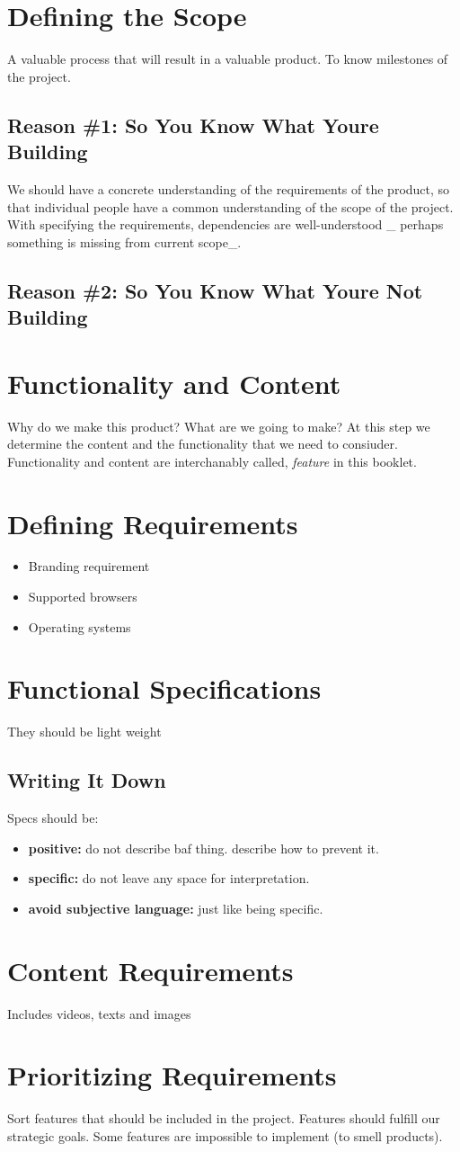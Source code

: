 \section{Defining the Scope}
A valuable process that will result in a valuable product. To know milestones of the project.
\subsection{Reason \#1: So You Know What Youre Building}
We should have a concrete understanding of the requirements of the product, so that individual people have a common understanding of the scope of the project. With specifying the 
requirements, dependencies are well-understood \_ perhaps something is missing from current scope\_.
\subsection{Reason \#2: So You Know What Youre Not Building}
\section{Functionality and Content}
Why do we make this product? What are we going to make? At this step we determine the content and the functionality that we need
 to consiuder. Functionality and content are interchanably called, \textit{feature} in this booklet.
\section{Defining Requirements}
\begin{itemize}
    \item Branding requirement
    \item Supported browsers
    \item Operating systems
\end{itemize}
\section{Functional Specifications}
They should be light weight
\subsection{Writing It Down}
Specs should be:
\begin{itemize}
    \item \textbf{positive: } do not describe baf thing. describe how to prevent it.
    \item \textbf{specific: } do not leave any space for interpretation.
    \item \textbf{avoid subjective language: } just like being specific. 
\end{itemize}
\section{Content Requirements}
Includes videos, texts and images
\section{Prioritizing Requirements}
Sort features that should be included in the project. Features should fulfill our strategic goals. 
Some features are impossible to implement (to smell products). 